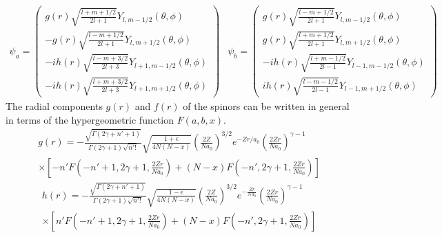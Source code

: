     \begin{equation}
    \begin{array}{lr}
        \psi_a = 
        \left(
            \begin{array}{c}
                g(r)    \sqrt{\frac{l+m+1/2}{2l+1}}     Y_{l,m-1/2}(\theta,\phi)    \\
                -g(r)   \sqrt{\frac{l-m+1/2}{2l+1}}     Y_{l,m+1/2}(\theta,\phi)    \\
                -ih(r)  \sqrt{\frac{l-m+3/2}{2l+3}}     Y_{l+1,m-1/2}(\theta,\phi)  \\
                -ih(r)  \sqrt{\frac{l+m+3/2}{2l+3}}     Y_{l+1,m+1/2}(\theta,\phi)
            \end{array}
        \right)
        &
        \psi_b =
        \left(
            \begin{array}{c}
                 g(r)   \sqrt{\frac{l-m+1/2}{2l+1}}     Y_{l,m-1/2}(\theta,\phi)    \\
                g(r)    \sqrt{\frac{l+m+1/2}{2l+1}}     Y_{l,m+1/2}(\theta,\phi)    \\
                -ih(r)  \sqrt{\frac{l+m-1/2}{2l-1}}     Y_{l-1,m-1/2}(\theta,\phi)  \\
                ih(r)   \sqrt{\frac{l-m-1/2}{2l-1}}     Y_{l-1,m+1/2}(\theta,\phi)
            \end{array}
        \right)
    \end{array}
    \end{equation}
    The radial components $g(r)$ and $f(r)$ of the spinors can be written in
    general in terms of the hypergeometric function $F(a,b,x)$. 
    \begin{equation}
    \begin{split}
    g(r) = - \frac{\sqrt{\Gamma(2\gamma + n' + 1)}}{\Gamma(2\gamma+1)\sqrt{n'!}}
             \sqrt{\frac{1+\epsilon}{4N(N-x)}} 
             \left( \frac{2Z}{Na_0} \right)^{3/2}
             e^{-Zr/a_0}
             \left( \frac{2Zr}{Na_0} \right)^{\gamma-1} 
             \\
             \times
             \left[
                -n' F(-n'+1,2\gamma+1,\frac{2Zr}{Na_0})
                +
                (N-x) F(-n',2\gamma+1,\frac{2Zr}{Na_0})
             \right]
    \end{split}
    \end{equation}
    \begin{equation}
    \begin{split}
    h(r) = - \frac{\sqrt{\Gamma(2\gamma+n'+1)}}{\Gamma(2\gamma+1)\sqrt{n'!}}
             \sqrt{\frac{1-\epsilon}{4N(N-x)}}
             \left( \frac{2Z}{Na_0} \right)^{3/2}
             e^{-\frac{Zr}{Na_0}}
             \left( \frac{2Zr}{Na_0} \right)^{\gamma-1}
             \\
             \times
             \left[
                n' F(-n'+1,2\gamma+1,\frac{2Zr}{Na_0})
                + (N-x) F(-n',2\gamma+1,\frac{2Zr}{Na_0})
             \right]
    \end{split}
    \end{equation}
